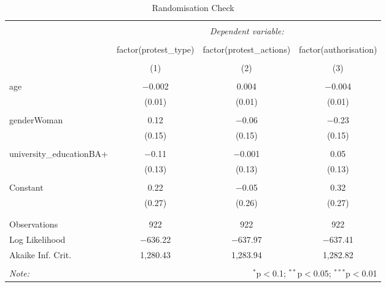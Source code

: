 
\begin{table}[!htbp] \centering 
  \caption{Randomisation Check} 
  \label{} 
\begin{tabular}{@{\extracolsep{5pt}}lccc} 
\\[-1.8ex]\hline 
\hline \\[-1.8ex] 
 & \multicolumn{3}{c}{\textit{Dependent variable:}} \\ 
\cline{2-4} 
\\[-1.8ex] & factor(protest\_type) & factor(protest\_actions) & factor(authorisation) \\ 
\\[-1.8ex] & (1) & (2) & (3)\\ 
\hline \\[-1.8ex] 
 age & $-$0.002 & 0.004 & $-$0.004 \\ 
  & (0.01) & (0.01) & (0.01) \\ 
  & & & \\ 
 genderWoman & 0.12 & $-$0.06 & $-$0.23 \\ 
  & (0.15) & (0.15) & (0.15) \\ 
  & & & \\ 
 university\_educationBA+ & $-$0.11 & $-$0.001 & 0.05 \\ 
  & (0.13) & (0.13) & (0.13) \\ 
  & & & \\ 
 Constant & 0.22 & $-$0.05 & 0.32 \\ 
  & (0.27) & (0.26) & (0.27) \\ 
  & & & \\ 
\hline \\[-1.8ex] 
Observations & 922 & 922 & 922 \\ 
Log Likelihood & $-$636.22 & $-$637.97 & $-$637.41 \\ 
Akaike Inf. Crit. & 1,280.43 & 1,283.94 & 1,282.82 \\ 
\hline 
\hline \\[-1.8ex] 
\textit{Note:}  & \multicolumn{3}{r}{$^{*}$p$<$0.1; $^{**}$p$<$0.05; $^{***}$p$<$0.01} \\ 
\end{tabular} 
\end{table} 
